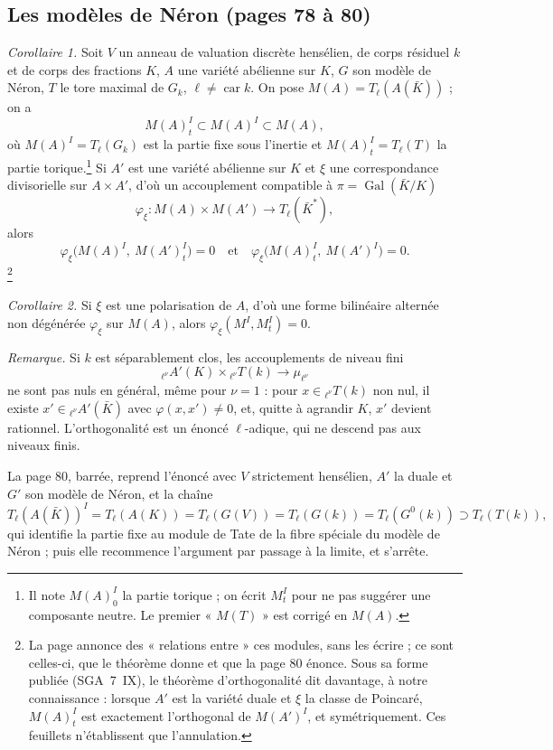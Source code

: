 \documentclass[11pt,a4paper]{article}
\begin{document}
\subsection*{Les modèles de Néron (pages 78 à 80)}

\emph{Corollaire 1.} Soit $V$ un anneau de valuation discrète hensélien, de corps
résiduel $k$ et de corps des fractions $K$, $A$ une variété abélienne sur $K$, $G$
son modèle de Néron, $T$ le tore maximal de $G_k$, $\ell \neq \operatorname{car}
k$. On pose $M(A) = T_\ell(A(\bar K))$ ; on a
\[ M(A)^I_t \subset M(A)^I \subset M(A) , \]
où $M(A)^I = T_\ell(G_k)$ est la partie fixe sous l'inertie et $M(A)^I_t =
T_\ell(T)$ la partie torique.\footnote{Il note $M(A)^I_0$ la partie torique ; on
écrit $M^I_t$ pour ne pas suggérer une composante neutre. Le premier « $M(T)$ »
est corrigé en $M(A)$.} Si $A'$ est une variété abélienne sur $K$ et $\xi$ une
correspondance divisorielle sur $A \times A'$, d'où un accouplement compatible à
$\pi = \operatorname{Gal}(\bar K/K)$
\[ \varphi_\xi\colon M(A) \times M(A') \to T_\ell(\bar K^*) , \]
alors
\[ \varphi_\xi\bigl(M(A)^I,\ M(A')^I_t\bigr) = 0 \quad\text{et}\quad
\varphi_\xi\bigl(M(A)^I_t,\ M(A')^I\bigr) = 0 . \]
\footnote{La page annonce des « relations entre » ces modules, sans les écrire ;
ce sont celles-ci, que le théorème donne et que la page 80 énonce. Sous sa forme
publiée (SGA~7~IX), le théorème d'orthogonalité dit davantage, à notre
connaissance : lorsque $A'$ est la variété duale et $\xi$ la classe de Poincaré, $M(A)^I_t$ est exactement l'orthogonal de $M(A')^I$, et symétriquement.
Ces feuillets n'établissent que l'annulation.}

\emph{Corollaire 2.} Si $\xi$ est une polarisation de $A$, d'où une forme
bilinéaire alternée non dégénérée $\varphi_\xi$ sur $M(A)$, alors
$\varphi_\xi(M^I, M^I_t) = 0$.

\emph{Remarque.} Si $k$ est séparablement clos, les accouplements de niveau fini
\[ {}_{\ell^\nu}A'(K) \times {}_{\ell^\nu}T(k) \to \mu_{\ell^\nu} \]
ne sont pas nuls en général, même pour $\nu = 1$ : pour $x \in {}_{\ell^\nu}T(k)$
non nul, il existe $x' \in {}_{\ell^\nu}A'(\bar K)$ avec $\varphi(x, x') \neq 0$,
et, quitte à agrandir $K$, $x'$ devient rationnel. L'orthogonalité est un énoncé
$\ell$-adique, qui ne descend pas aux niveaux finis.

La page 80, barrée, reprend l'énoncé avec $V$ strictement hensélien, $A'$ la duale
et $G'$ son modèle de Néron, et la chaîne
\[ T_\ell(A(\bar K))^I = T_\ell(A(K)) = T_\ell(G(V)) = T_\ell(G(k)) =
T_\ell(G^0(k)) \supset T_\ell(T(k)) , \]
qui identifie la partie fixe au module de Tate de la fibre spéciale du modèle de
Néron ; puis elle recommence l'argument par passage à la limite, et s'arrête.
\end{document}
